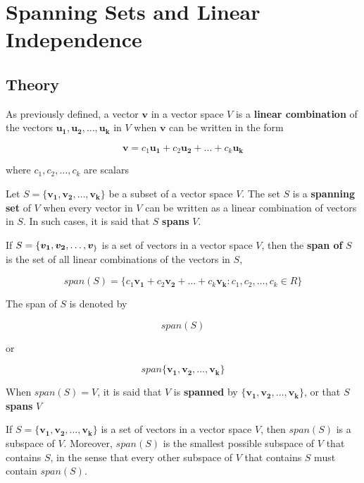 \documentclass{report}
\begin{document}
\section{Spanning Sets and Linear Independence}

\subsection{Theory}

\begin{tcolorbox}[title = Definition of a Linear Combination of Vectors]
		As previously defined, a vector $\bm{v}$ in a vector space $V$ is a \textbf{linear combination} of the vectors $\bm{u_1}, \bm{u_2}, \hdots, \bm{u_k}$ in $V$ when $\bm{v}$ can be written in the form 
		
		$$
		\bm{v} = c_1 \bm{u_1} + c_2 \bm{u_2} + \hdots + c_k \bm{u_k}
		$$
		
		where $c_1, c_2, \hdots, c_k$ are scalars
\end{tcolorbox}

\begin{tcolorbox}[title = Definition of a Spanning Set of a Vector Space]
		Let $S = \{ \bm{v_1}, \bm{v_2}, \hdots, \bm{v_k}\}$ be a subset of a vector space $V$. The set $S$ is a \textbf{spanning set} of $V$ when every vector in $V$ can be written as a linear combination of vectors in $S$. In such cases, it is said that $S$ \textbf{spans} $V$.
\end{tcolorbox}

\begin{tcolorbox}[title = Definition of the Span of a Set]
		If  $S = \{ \bm{v_1}, \bm{v_2}, \hdots, \bm{v_} \}$ is a set of vectors in a vector space $V$, then the \textbf{span of } $S$ is the set of all linear combinations of the vectors in $S$,
		
		$$
		span(S) = \{ c_1  \bm{v_1} + c_2 \bm{v_2} + \hdots + c_k \bm{v_k}: c_1, c_2, \hdots, c_k \in R \}
		$$
		
		The span of $S$ is denoted by 
		
		$$
		span(S)
		$$
		
		or
		
		$$
		span \{ \bm{v_1}, \bm{v_2}, \hdots, \bm{v_k} \}
		$$
		
		When $span(S) = V$, it is said that $V$ is \textbf{spanned} by $\{ \bm{v_1}, \bm{v_2}, \hdots, \bm{v_k} \}$, or that $S$ \textbf{spans} $V$
\end{tcolorbox}

\begin{tcolorbox}[title = $Span(S)$ is a Subspace of $V$]
		If $S = \{ \bm{v_1}, \bm{v_2}, \hdots, \bm{v_k} \}$ is a set of vectors in a vector space $V$, then $span(S)$ is a subspace of $V$. Moreover, $span(S)$ is the smallest possible subspace of $V$ that contains $S$, in the sense that every other subspace of $V$ that contains $S$ must contain $span(S)$. 
\end{tcolorbox}
\end{document}
